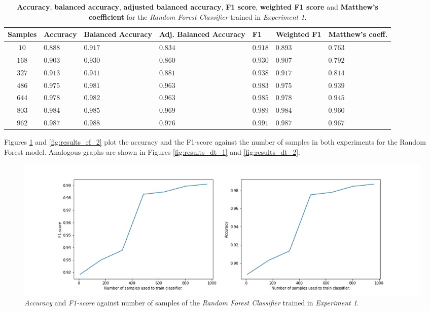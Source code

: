 \documentclass[sigplan,screen]{acmart}
\begin{document}
\begin{table}[h]
  \caption{\textbf{Accuracy}, \textbf{balanced accuracy}, \textbf{adjusted balanced accuracy}, \textbf{F1 score}, \textbf{weighted F1 score} and \textbf{Matthew's coefficient} for the \emph{Random Forest Classifier} trained in \emph{Experiment 1}.}
  \label{tab:rf_1_table_results}
  \begin{tabular}{cllllll}
    \toprule
    \textbf{Samples}&\textbf{Accuracy}&\textbf{Balanced Accuracy}&\textbf{Adj. Balanced Accuracy}&\textbf{F1}&\textbf{Weighted F1}&\textbf{Matthew's coeff.}\\
    \midrule
    $10$ & $0.888$ & $0.917$ & $0.834$ & $0.918$ & $0.893$ & $0.763$\\
    $168$ & $0.903$ & $0.930$ & $0.860$ & $0.930$ & $0.907$ & $0.792$\\
    $327$ & $0.913$ & $0.941$ & $0.881$ & $0.938$ & $0.917$ & $0.814$\\
    $486$ & $0.975$ & $0.981$ & $0.963$ & $0.983$ & $0.975$ & $0.939$\\
    $644$ & $0.978$ & $0.982$ & $0.963$ & $0.985$ & $0.978$ & $0.945$\\
    $803$ & $0.984$ & $0.985$ & $0.969$ & $0.989$ & $0.984$ & $0.960$\\
    $962$ & $0.987$ & $0.988$ & $0.976$ & $0.991$ & $0.987$ & $0.967$\\
    \bottomrule
    \end{tabular}
\end{table}

Figures \ref{fig:results_rf_1} and \ref{fig:results_rf_2} plot the accuracy and the F1-score against the number of samples in both experiments for the Random Forest model. Analogous graphs are shown in Figures \ref{fig:results_dt_1} and \ref{fig:results_dt_2}.

 \begin{figure}[h]
     \centering
     \includegraphics[width=\linewidth]{reports/figures/results_rf_1.jpg}
     \caption{\emph{Accuracy} and \emph{F1-score} against number of samples of the \emph{Random Forest Classifier} trained in \emph{Experiment 1}.}
     \label{fig:results_rf_1}
 \end{figure}
 
\end{document}
